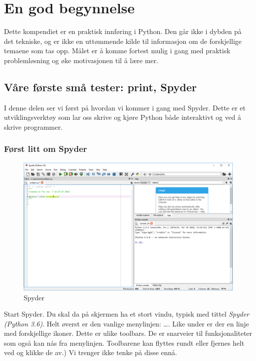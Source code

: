 \chapter{En god begynnelse}
Dette kompendiet er en praktisk innføring i Python. Den går ikke i dybden på det tekniske, og er ikke en uttømmende kilde til informasjon om de forskjellige temaene som tas opp. Målet er å komme fortest mulig i gang med praktisk problemløsning og øke motivasjonen til å lære mer.

\section{Våre første små tester: print, Spyder}

I denne delen ser vi først på hvordan vi kommer i gang med Spyder. Dette er et utviklingsverktøy som lar oss skrive og kjøre Python både interaktivt og ved å skrive programmer. 

\subsection*{Først litt om Spyder}
\begin{figure}[h]
\begin{center}
\includegraphics[width=1.0\textwidth]{img/spyder_overview.png}
\end{center}
\caption{Spyder}
\label{fig:spyder_overview}
\end{figure}

Start Spyder. Du skal da på skjermen ha et stort vindu, typisk med tittel \emph{Spyder (Python 3.6)}. Helt øverst er den vanlige menylinjen:   \ldots. Like under er der en linje med forskjellige ikoner. Dette er ulike toolbars. De er snarveier til funksjonaliteter som også kan nås fra menylinjen. Toolbarene kan flyttes rundt eller fjernes helt ved  og klikke de av.) Vi trenger ikke tenke på disse ennå. 


